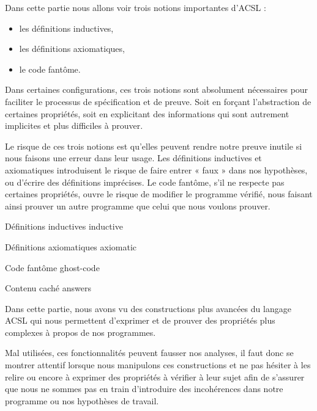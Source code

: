 Dans cette partie nous allons voir trois notions importantes d'ACSL :
\begin{itemize}
\item les définitions inductives,
\item les définitions axiomatiques,
\item le code fantôme.
\end{itemize}


Dans certaines configurations, ces trois notions sont absolument nécessaires
pour faciliter le processus de spécification et de preuve. Soit en forçant
l'abstraction de certaines propriétés, soit en explicitant des informations qui
sont autrement implicites et plus difficiles à prouver.



Le risque de ces trois notions est qu'elles peuvent rendre notre preuve inutile
si nous faisons une erreur dans leur usage. Les définitions inductives et
axiomatiques introduisent le risque de faire entrer « faux » dans nos
hypothèses, ou d'écrire des définitions imprécises. Le code fantôme, s'il ne
respecte pas certaines propriétés, ouvre le risque de modifier le programme
vérifié, nous faisant ainsi prouver un autre programme que celui que nous
voulons prouver.


\begin{levelTwo}
  {Définitions inductives}
  {inductive}
\end{levelTwo}


\begin{levelTwo}
  {Définitions axiomatiques}
  {axiomatic}
\end{levelTwo}


\begin{levelTwo}
  {Code fantôme}
  {ghost-code}
\end{levelTwo}


\begin{levelTwo}
  {Contenu caché}
  {answers}
\end{levelTwo}


\horizontalLine
\newpage


Dans cette partie, nous avons vu des constructions plus avancées du langage ACSL
qui nous permettent d'exprimer et de prouver des propriétés plus complexes à
propos de nos programmes.



Mal utilisées, ces fonctionnalités peuvent fausser nos analyses, il faut donc se
montrer attentif lorsque nous manipulons ces constructions et ne pas hésiter à
les relire ou encore à exprimer des propriétés à vérifier à leur sujet afin de
s'assurer que nous ne sommes pas en train d'introduire des incohérences dans
notre programme ou nos hypothèses de travail.
